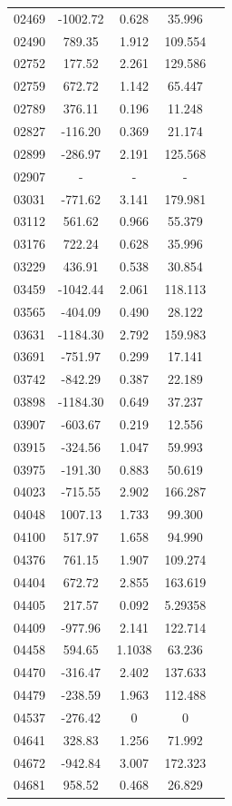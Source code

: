 {\begin{longtable}{ccccc}
02469 & -1002.72 & 0.628 & 35.996\\
02490 & 789.35 & 1.912 & 109.554\\
02752 & 177.52 & 2.261 & 129.586\\
02759 & 672.72 & 1.142 & 65.447\\
02789 & 376.11 & 0.196 & 11.248\\
02827 & -116.20 & 0.369 & 21.174\\
02899 & -286.97 & 2.191 & 125.568\\
02907 &       - &     - & - \\
03031 & -771.62 & 3.141 & 179.981\\
03112 & 561.62 & 0.966 & 55.379\\
03176 & 722.24 & 0.628 & 35.996 \\
03229 & 436.91 & 0.538 & 30.854 \\
03459 & -1042.44 & 2.061 & 118.113\\
03565 & -404.09 & 0.490 & 28.122\\
03631 & -1184.30 & 2.792 & 159.983\\
03691 & -751.97 & 0.299 & 17.141\\
03742 & -842.29 & 0.387 & 22.189\\
03898 & -1184.30 & 0.649 & 37.237\\
03907 & -603.67 & 0.219 & 12.556\\
03915 & -324.56 & 1.047 & 59.993\\
03975 & -191.30 & 0.883 & 50.619\\
04023 & -715.55 & 2.902 & 166.287\\
04048 & 1007.13 & 1.733 & 99.300\\
04100 & 517.97 & 1.658 & 94.990\\
04376 & 761.15 & 1.907 & 109.274\\
04404 & 672.72 & 2.855 & 163.619\\
04405 & 217.57 & 0.092 & 5.29358\\
04409 & -977.96 & 2.141 & 122.714\\
04458 & 594.65 & 1.1038 & 63.236\\
04470 & -316.47 & 2.402 & 137.633\\
04479 & -238.59 & 1.963 & 112.488\\
04537 & -276.42 & 0 & 0\\
04641 & 328.83 & 1.256 & 71.992\\
04672 & -942.84 & 3.007 & 172.323\\
04681 & 958.52 & 0.468 & 26.829\\

\end{longtable}}
